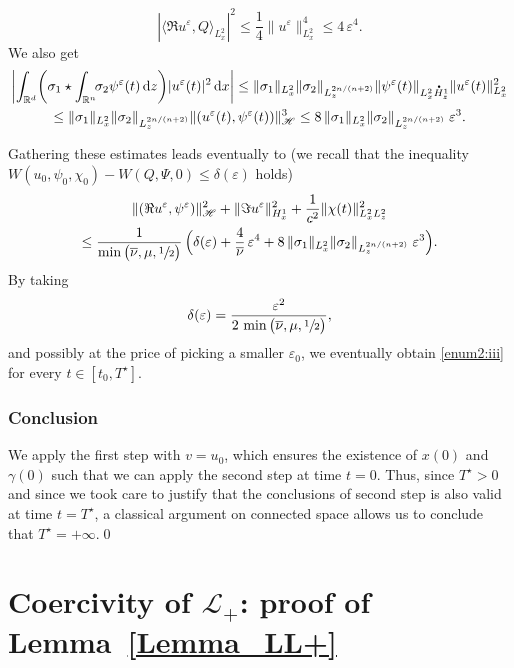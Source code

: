 \documentclass[JEP,XML,SOM,NoEqCountersInSection,NoFloatCountersInSection,Unicode,published]{cedram}
\let\bar\oldbar
\theoremstyle{definition}
\newcommand*{\overbigdot}[1]{%
\accentset{\mbox{\large\bfseries .}}{#1}}
\let\bar\overline
\newcommand{\R}{\mathbb{R}}
\newcommand{\ud}{\, {\mathrm{d}}}
\begin{document}
\[
\left|\langle \Re u^{\varepsilon},Q\rangle_{L_{x}^{2}}\right|^{2}\leq\frac{1}{4}\|u^{\varepsilon}\|_{L_{x}^{2}}^{4}\leq 4\,\varepsilon^{4}.
\]
We also get
\bgroup
{}
\begin{multline*}
\left|\int_{\R^{d}}\biggl(\sigma_{1}\star\int_{\R^{n}}\!\!\sigma_{2}\psi^{\varepsilon}(t)\ud z\biggr)|u^{\varepsilon}(t)|^{2}\ud x\right|\leq\|\sigma_{1}\|_{L_{x}^{2}}\|\sigma_{2}\|_{L_{z}^{2n/(n+2)}}\|\psi^{\varepsilon}(t)\|_{L_{x}^{2}\overbigdot{H}_{z}^{1}}\|u^{\varepsilon}(t)\|_{L_{x}^{2}}^{2}\\
\leq\|\sigma_{1}\|_{L_{x}^{2}}\|\sigma_{2}\|_{L_{z}^{2n/(n+2)}}\|(u^{\varepsilon}(t),\psi^{\varepsilon}(t))\|_{\mathscr{H}}^{3}\leq 8\,\|\sigma_{1}\|_{L_{x}^{2}}\|\sigma_{2}\|_{L_{z}^{2n/(n+2)}}\;\varepsilon^{3}.
\end{multline*}
\egroup

Gathering these estimates leads eventually to (we recall that the inequality $W(u_{0},\psi_{0},\chi_{0})-W(Q,\Psi,0)\leq\delta(\varepsilon)$ holds)
\begin{multline*}
\|(\Re u^{\varepsilon},\psi^{\varepsilon})\|_{\mathscr{H}}^{2}+\|\Im u^{\varepsilon}\|_{H_{x}^{1}}^{2}+\frac{1}{c^{2}}\|\chi(t)\|_{L_{x}^{2}L_{z}^{2}}^{2}\\
\leq\frac{1}{\min\big(\bar{\nu},\mu,\sfrac{1}{2}\big)}\,\Bigl(\delta(\varepsilon)+\frac{4}{\bar{\nu}}\,\varepsilon^{4}+8\,\|\sigma_{1}\|_{L_{x}^{2}}\|\sigma_{2}\|_{L_{z}^{2n/(n+2)}}\;\varepsilon^{3}\Bigr).
\end{multline*}
By taking
\[
\delta(\varepsilon)=\frac{\varepsilon^{2}}{2\,\min\big(\bar{\nu},\mu,\sfrac{1}{2}\big)},
\]
and possibly at the price of picking a smaller $\varepsilon_{0}$, we eventually obtain \eqref{enum2:iii} for every $t\in[t_{0},T^{\star}]$.

\subsubsection*{Conclusion} We apply the first step with $v=u_{0}$, which ensures the existence of $x(0)$ and $\gamma(0)$ such that we can apply the second step at time $t=0$. Thus, since $T^{\star}>0$ and since we took care to justify that the conclusions of second step is also valid at time $t=T^{\star}$, a classical argument on connected space allows us to conclude that $T^{\star}=+\infty$.\qed

\section{Coercivity of \texorpdfstring{$\mathcal{L}_{+}$}{L}: proof of Lemma~\ref{Lemma_LL+}}\label{Proof_Lemma_LL+}
\end{document}
